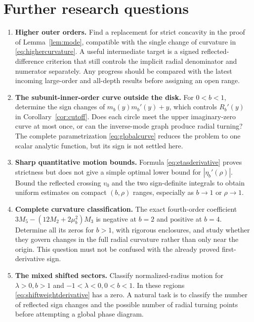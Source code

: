 \documentclass[11pt]{article}
\numberwithin{equation}{section}
\theoremstyle{definition}
\theoremstyle{remark}
\begin{document}
\section{Further research questions}
\label{sec:future}
\begin{enumerate}[leftmargin=*,itemsep=7pt]
\item \textbf{Higher outer orders.} Find a replacement for strict
concavity in the proof of Lemma~\ref{lem:mode}, compatible with the
single change of curvature in \eqref{eq:highercurvature}. A useful
intermediate target is a signed reflected-difference criterion that
still controls the implicit radial denominator and numerator
separately. Any progress should be compared with the latest incoming
large-order and all-depth results before assigning an open range.

\item \textbf{The subunit-inner-order curve outside the disk.}
For $0<b<1$, determine the sign changes of
$m_b(y)m_b'(y)+y$, which controls $R_b'(y)$ in
Corollary~\ref{cor:cutoff}. Does each circle meet the upper imaginary-zero
curve at most once, or can the inverse-mode graph produce radial
turning? The complete parametrization \eqref{eq:globalcurve} reduces
the problem to one scalar analytic function, but its sign is not
settled here.

\item \textbf{Sharp quantitative motion bounds.} Formula
\eqref{eq:etasderivative} proves strictness but does not give a simple
optimal lower bound for $|\eta_b'(\rho)|$. Bound the reflected crossing
$v_0$ and the two sign-definite integrals to obtain uniform estimates
on compact $(b,\rho)$ ranges, especially as $b\to1$ or $\rho\to1$.

\item \textbf{Complete curvature classification.} The exact fourth-order
coefficient
$3M_5-(12M_2+2\mu_b^2)M_3$ is negative at $b=2$ and positive at $b=4$.
Determine all its zeros for $b>1$, with rigorous enclosures, and study
whether they govern changes in the full radial curvature rather than
only near the origin. This question must not be confused with the
already proved first-derivative sign.

\item \textbf{The mixed shifted sectors.} Classify normalized-radius
motion for $\lambda>0,b>1$ and $-1<\lambda<0,0<b<1$. In these regions
\eqref{eq:shiftweightderivative} has a zero. A natural task is to
classify the number of reflected sign changes and the possible
number of radial turning points before attempting a global phase
diagram.


\end{enumerate}
\end{document}

